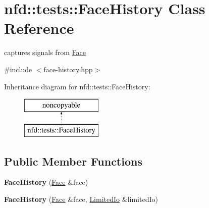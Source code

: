 \hypertarget{classnfd_1_1tests_1_1FaceHistory}{}\section{nfd\+:\+:tests\+:\+:Face\+History Class Reference}
\label{classnfd_1_1tests_1_1FaceHistory}


captures signals from \hyperlink{classnfd_1_1Face}{Face}  




{\ttfamily \#include $<$face-\/history.\+hpp$>$}

Inheritance diagram for nfd\+:\+:tests\+:\+:Face\+History\+:\begin{figure}[H]
\begin{center}
\leavevmode
\includegraphics[height=2.000000cm]{classnfd_1_1tests_1_1FaceHistory}
\end{center}
\end{figure}
\subsection*{Public Member Functions}
\begin{DoxyCompactItemize}
\item 
{\bfseries Face\+History} (\hyperlink{classnfd_1_1Face}{Face} \&face)\hypertarget{classnfd_1_1tests_1_1FaceHistory_a800a67f28fe4a21f9f516a27db748ecd}{}\label{classnfd_1_1tests_1_1FaceHistory_a800a67f28fe4a21f9f516a27db748ecd}

\item 
{\bfseries Face\+History} (\hyperlink{classnfd_1_1Face}{Face} \&face, \hyperlink{classnfd_1_1tests_1_1LimitedIo}{Limited\+Io} \&limited\+Io)\hypertarget{classnfd_1_1tests_1_1FaceHistory_a424371d4eb386a36b6a90cce7578d486}{}\label{classnfd_1_1tests_1_1FaceHistory_a424371d4eb386a36b6a90cce7578d486}

\end{DoxyCompactItemize}
